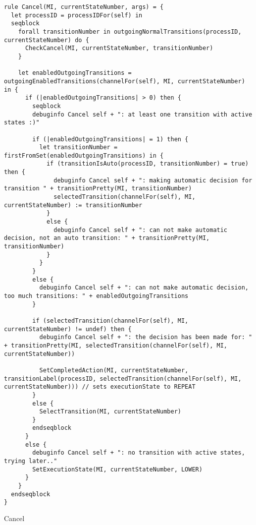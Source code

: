 \begin{listing}[H]
\begin{verbatim}
rule Cancel(MI, currentStateNumber, args) = {
  let processID = processIDFor(self) in
  seqblock
    forall transitionNumber in outgoingNormalTransitions(processID, currentStateNumber) do {
      CheckCancel(MI, currentStateNumber, transitionNumber)
    }

    let enabledOutgoingTransitions = outgoingEnabledTransitions(channelFor(self), MI, currentStateNumber) in {
      if (|enabledOutgoingTransitions| > 0) then {
        seqblock
        debuginfo Cancel self + ": at least one transition with active states :)"

        if (|enabledOutgoingTransitions| = 1) then {
          let transitionNumber = firstFromSet(enabledOutgoingTransitions) in {
            if (transitionIsAuto(processID, transitionNumber) = true) then {
              debuginfo Cancel self + ": making automatic decision for transition " + transitionPretty(MI, transitionNumber)
              selectedTransition(channelFor(self), MI, currentStateNumber) := transitionNumber
            }
            else {
              debuginfo Cancel self + ": can not make automatic decision, not an auto transition: " + transitionPretty(MI, transitionNumber)
            }
          }
        }
        else {
          debuginfo Cancel self + ": can not make automatic decision, too much transitions: " + enabledOutgoingTransitions
        }

        if (selectedTransition(channelFor(self), MI, currentStateNumber) != undef) then {
          debuginfo Cancel self + ": the decision has been made for: " + transitionPretty(MI, selectedTransition(channelFor(self), MI, currentStateNumber))

          SetCompletedAction(MI, currentStateNumber, transitionLabel(processID, selectedTransition(channelFor(self), MI, currentStateNumber))) // sets executionState to REPEAT
        }
        else {
          SelectTransition(MI, currentStateNumber)
        }
        endseqblock
      }
      else {
        debuginfo Cancel self + ": no transition with active states, trying later.."
        SetExecutionState(MI, currentStateNumber, LOWER)
      }
    }
  endseqblock
}
\end{verbatim}
\caption{Cancel}
\label{lst:asm:Cancel}
\end{listing}




